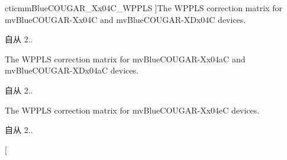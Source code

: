 \begin{Desc}
\begin{description}
{\hypertarget{group___common_interface_gga514bdc683ef27995fdeba04aec25f571aca2ef8532d378c2267fcac2ac04cb908}{cticmm\+Blue\+C\+O\+U\+G\+A\+R\+\_\+\+Xx04\+C\+\_\+\+W\+P\+P\+L\+S}\label{group___common_interface_gga514bdc683ef27995fdeba04aec25f571aca2ef8532d378c2267fcac2ac04cb908}
}]The W\+P\+P\+L\+S correction matrix for mv\+Blue\+C\+O\+U\+G\+A\+R-\/\+Xx04\+C and mv\+Blue\+C\+O\+U\+G\+A\+R-\/\+X\+Dx04\+C devices. \begin{DoxySince}{自从}
2.. 
\end{DoxySince}
\item[{\em 
\hypertarget{group___common_interface_gga514bdc683ef27995fdeba04aec25f571a2a42a582ca123b6fbb40d94584a94d2f}{cticmm\+Blue\+C\+O\+U\+G\+A\+R\+\_\+\+Xx04a\+C\+\_\+\+W\+P\+P\+L\+S}\label{group___common_interface_gga514bdc683ef27995fdeba04aec25f571a2a42a582ca123b6fbb40d94584a94d2f}
}]The W\+P\+P\+L\+S correction matrix for mv\+Blue\+C\+O\+U\+G\+A\+R-\/\+Xx04a\+C and mv\+Blue\+C\+O\+U\+G\+A\+R-\/\+X\+Dx04a\+C devices. \begin{DoxySince}{自从}
2.. 
\end{DoxySince}
\item[{\em 
\hypertarget{group___common_interface_gga514bdc683ef27995fdeba04aec25f571af277a57aaa8f0305dd1c4dafff319a07}{cticmm\+Blue\+C\+O\+U\+G\+A\+R\+\_\+\+Xx04e\+C\+\_\+\+W\+P\+P\+L\+S}\label{group___common_interface_gga514bdc683ef27995fdeba04aec25f571af277a57aaa8f0305dd1c4dafff319a07}
}]The W\+P\+P\+L\+S correction matrix for mv\+Blue\+C\+O\+U\+G\+A\+R-\/\+Xx04e\+C devices. \begin{DoxySince}{自从}
2.. 
\end{DoxySince}
\item[{\em 
}
\end{description}
\end{Desc}
